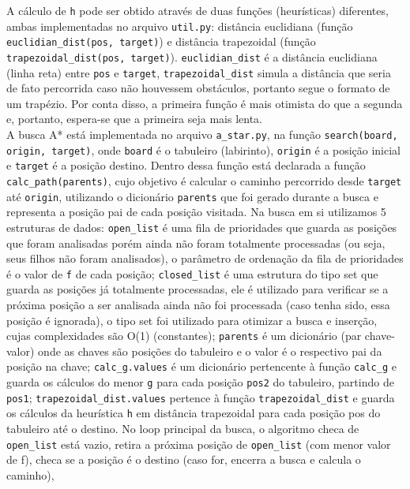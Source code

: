 \documentclass{article}
\begin{document}
A cálculo de \verb|h| pode ser obtido através de duas funções (heurísticas) diferentes, ambas implementadas no arquivo \verb|util.py|: distância euclidiana (função \verb|euclidian_dist(pos, target)|) e distância trapezoidal (função \verb|trapezoidal_dist(pos, target)|). \verb|euclidian_dist| é a distância euclidiana (linha reta) entre \verb|pos| e \verb|target|, \verb|trapezoidal_dist| simula a distância que seria de fato percorrida caso não houvessem obstáculos, portanto segue o formato de um trapézio. Por conta disso, a primeira função é mais otimista do que a segunda e, portanto, espera-se que a primeira seja mais lenta.\\
A busca A* está implementada no arquivo \verb|a_star.py|, na função \verb|search(board, origin, target)|, onde \verb|board| é o tabuleiro (labirinto), \verb|origin| é a posição inicial e \verb|target| é a posição destino. Dentro dessa função está declarada a função \verb|calc_path(parents)|, cujo objetivo é calcular o caminho percorrido desde \verb|target| até \verb|origin|, utilizando o dicionário \verb|parents| que foi gerado durante a busca e representa a posição pai de cada posição visitada. Na busca em si utilizamos 5 estruturas de dados: \verb|open_list| é uma fila de prioridades que guarda as posições que foram analisadas porém ainda não foram totalmente processadas (ou seja, seus filhos não foram analisados), o parâmetro de ordenação da fila de prioridades é o valor de \verb|f| de cada posição; \verb|closed_list| é uma estrutura do tipo set que guarda as posições já totalmente processadas, ele é utilizado para verificar se a próxima posição a ser analisada ainda não foi processada (caso tenha sido, essa posição é ignorada), o tipo set foi utilizado para otimizar a busca e inserção, cujas complexidades são O(1) (constantes); \verb|parents| é um dicionário (par chave-valor) onde as chaves são posições do tabuleiro e o valor é o respectivo pai da posição na chave; \verb|calc_g.values| é um dicionário pertencente à função \verb|calc_g| e guarda os cálculos do menor \verb|g| para cada posição \verb|pos2| do tabuleiro, partindo de \verb|pos1|; \verb|trapezoidal_dist.values| pertence à função \verb|trapezoidal_dist| e guarda os cálculos da heurística \verb|h| em distância trapezoidal para cada posição pos do tabuleiro até o destino. No loop principal da busca, o algoritmo checa de \verb|open_list| está vazio, retira a próxima posição de \verb|open_list| (com menor valor de f), checa se a posição é o destino (caso for, encerra a busca e calcula o caminho),
\end{document}
